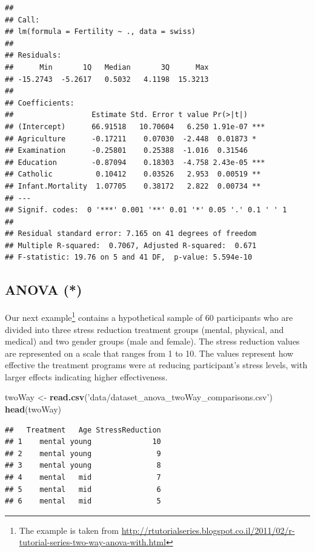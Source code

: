 \documentclass[]{book}
\newenvironment{Shaded}{\begin{snugshade}}{\end{snugshade}}
\newcommand{\KeywordTok}[1]{\textcolor[rgb]{0.13,0.29,0.53}{\textbf{#1}}}
\newcommand{\StringTok}[1]{\textcolor[rgb]{0.31,0.60,0.02}{#1}}
\newcommand{\NormalTok}[1]{#1}
\theoremstyle{definition}
\theoremstyle{definition}
\theoremstyle{definition}
\theoremstyle{remark}
\begin{document}
\begin{verbatim}
## 
## Call:
## lm(formula = Fertility ~ ., data = swiss)
## 
## Residuals:
##      Min       1Q   Median       3Q      Max 
## -15.2743  -5.2617   0.5032   4.1198  15.3213 
## 
## Coefficients:
##                  Estimate Std. Error t value Pr(>|t|)    
## (Intercept)      66.91518   10.70604   6.250 1.91e-07 ***
## Agriculture      -0.17211    0.07030  -2.448  0.01873 *  
## Examination      -0.25801    0.25388  -1.016  0.31546    
## Education        -0.87094    0.18303  -4.758 2.43e-05 ***
## Catholic          0.10412    0.03526   2.953  0.00519 ** 
## Infant.Mortality  1.07705    0.38172   2.822  0.00734 ** 
## ---
## Signif. codes:  0 '***' 0.001 '**' 0.01 '*' 0.05 '.' 0.1 ' ' 1
## 
## Residual standard error: 7.165 on 41 degrees of freedom
## Multiple R-squared:  0.7067, Adjusted R-squared:  0.671 
## F-statistic: 19.76 on 5 and 41 DF,  p-value: 5.594e-10
\end{verbatim}

\subsection{ANOVA (*)}\label{anova}

Our next example\footnote{The example is taken from
  \url{http://rtutorialseries.blogspot.co.il/2011/02/r-tutorial-series-two-way-anova-with.html}}
contains a hypothetical sample of \(60\) participants who are divided
into three stress reduction treatment groups (mental, physical, and
medical) and two gender groups (male and female). The stress reduction
values are represented on a scale that ranges from 1 to 10. The values
represent how effective the treatment programs were at reducing
participant's stress levels, with larger effects indicating higher
effectiveness.

\begin{Shaded}
\begin{Highlighting}[]
\NormalTok{twoWay <-}\StringTok{ }\KeywordTok{read.csv}\NormalTok{(}\StringTok{'data/dataset_anova_twoWay_comparisons.csv'}\NormalTok{)}
\KeywordTok{head}\NormalTok{(twoWay)}
\end{Highlighting}
\end{Shaded}

\begin{verbatim}
##   Treatment   Age StressReduction
## 1    mental young              10
## 2    mental young               9
## 3    mental young               8
## 4    mental   mid               7
## 5    mental   mid               6
## 6    mental   mid               5
\end{verbatim}
\end{document}
